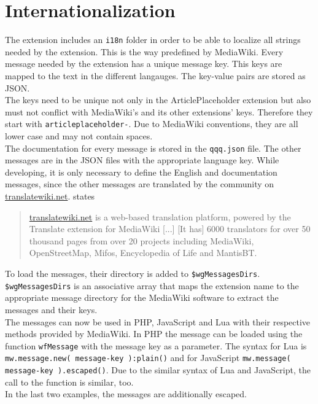 \section{Internationalization}

The extension includes an \texttt{\justify i18n} folder in order to be able to localize all strings needed by the extension. This is the way predefined by MediaWiki.  Every message needed by the extension has a unique message key. This keys are mapped to the text in the different langauges. The key-value pairs are stored as JSON. \\
The keys need to be unique not only in the ArticlePlaceholder extension but also must not conflict with MediaWiki's and its other extensions' keys. Therefore they start with \texttt{\justify articleplaceholder-}. Due to MediaWiki conventions, they are all lower case and may not contain spaces.  \\
The documentation for every message is stored in the \texttt{\justify qqq.json} file. The other messages are in the JSON files with the appropriate language key. While developing, it is only necessary to define the English and documentation messages, since the other messages are translated by the community on \url{translatewiki.net}.  \citet{wiki:26} states
\begin{quote}
 \url{translatewiki.net} is a web-based translation platform, powered by the Translate extension for MediaWiki [...] [It has] 6000 translators for over 50 thousand pages from over 20 projects including MediaWiki, OpenStreetMap, Mifos, Encyclopedia of Life and MantisBT.
\end{quote}

To load the messages, their directory is added to \texttt{\justify \$wgMessagesDirs}. \texttt{\justify \$wgMessagesDirs} is an associative array that maps the extension name to the appropriate message directory for the MediaWiki software to extract the messages and their keys. \\
The messages can now be used in PHP, JavaScript and Lua with their respective methods provided by MediaWiki. In PHP the message can be loaded using the function \texttt{\justify wfMessage} with the message key as a parameter. The syntax for Lua is \texttt{\justify mw.message.new( message-key ):plain()} and for JavaScript \texttt{\justify mw.message( message-key ).escaped()}. Due to the similar syntax of Lua and JavaScript, the call to the function is similar, too. \\ In the last two examples, the messages are additionally escaped.